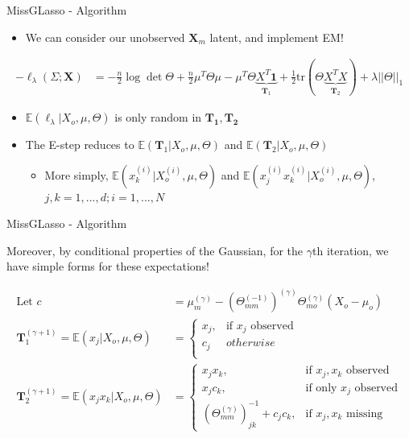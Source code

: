 \documentclass{beamer}
\begin{document}
\begin{frame}{MissGLasso - Algorithm}
\begin{itemize}
    \item We can consider our unobserved $\mathbf{X}_m$ latent, and implement EM! 
\end{itemize}

\begin{align*}
    -\ell_\lambda(\Sigma; \mathbf{X})
    &=
    -
    \frac{n}{2}\log \det \Theta 
    +
    \frac{n}{2} \mu^T \Theta \mu 
    -
    \mu^T \Theta \underbrace{X^T \mathbf{1}}_{\mathbf{T}_1}
    +
    \frac{1}{2}\text{tr}(\Theta \underbrace{X^T X}_{\mathbf{T}_2})
    +
    \lambda||\Theta||_1
\end{align*}

\begin{itemize}
    \item $\mathbb{E}(\ell_\lambda | X_o, \mu, \Theta)$ is only random in $\mathbf{T_1, T_2}$
    \item The E-step reduces to $\mathbb{E}(\mathbf{T}_1 | X_o, \mu, \Theta)$ and $\mathbb{E}(\mathbf{T}_2 | X_o, \mu, \Theta)$
    \begin{itemize}
        \item More simply,  $\mathbb{E}(x_k^{(i)} | X_o^{(i)}, \mu, \Theta)$ and $\mathbb{E}(x_j^{(i)} x_k^{(i)} | X_o^{(i)}, \mu, \Theta)$, $j,k=1,...,d; i=1,...,N$ 
    \end{itemize}
\end{itemize}

\end{frame}

\begin{frame}{MissGLasso - Algorithm}

Moreover, by conditional properties of the Gaussian, for the $\gamma$th iteration, we have simple forms for these expectations! 


\begin{align*}
    \text{Let }
    c
    &= 
    \mu_m^{(\gamma)}
    -
    (\Theta^{(-1)}_{mm})^{(\gamma)}
    \Theta_{mo}^{(\gamma)}
    (X_o - \mu_o)
    \\ 
    \mathbf{T}_1^{(\gamma+1)}
    =
    \mathbb{E}(x_j | X_o, \mu, \Theta)
    &=
    \begin{cases}
        x_j, & \text{if $x_j$ observed} \\ 
        c_j 
         & otherwise \\ 
    \end{cases}
\\
    \mathbf{T}_2^{(\gamma+1)}
    =
    \mathbb{E}(x_jx_k | X_o, \mu, \Theta)
    &=
    \begin{cases}
        x_jx_k, & \text{if $x_j,x_k$ observed} \\ 
        x_j c_k, & \text{if only $x_j$ observed} \\ 
        \left(\Theta_{mm}^{(\gamma)} \right)^{-1}_{jk}
        +
        c_j c_k, & \text{if $x_j, x_k$ missing}
    \end{cases}
\end{align*}

\end{frame}
\end{document}
